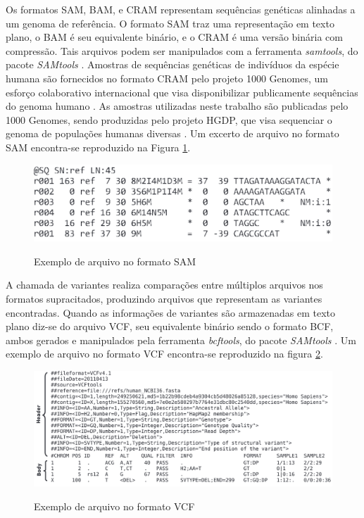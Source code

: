 \documentclass[cic,tc]{iiufrgs}
\begin{document}
Os formatos SAM, BAM, e CRAM representam sequências genéticas alinhadas a um
genoma de referência. O formato SAM traz uma representação em texto plano, o
BAM é seu equivalente binário, e o CRAM é uma versão binária com compressão.
Tais arquivos podem ser manipulados com a ferramenta \textit{samtools}, do pacote
\textit{SAMtools} \cite{danecek2021twelve}. Amostras de sequências genéticas de
indivíduos da espécie humana são fornecidos no formato CRAM pelo projeto 1000
Genomes, um esforço colaborativo internacional que visa disponibilizar
publicamente sequências do genoma humano \cite{via20101000}. As amostras
utilizadas neste trabalho são publicadas pelo 1000 Genomes, sendo produzidas
pelo projeto HGDP, que visa sequenciar o genoma de populações humanas diversas
\cite{cavalli2005human}. Um excerto de arquivo no formato SAM encontra-se
reproduzido na Figura \ref{fig:sam}.

\begin{figure}[h] \caption{Exemplo de arquivo no formato SAM} \begin{center}
\includegraphics[width=0.8\linewidth]{img/sam.png} \end{center}
 \label{fig:sam} \end{figure}

A chamada de variantes realiza comparações entre múltiplos arquivos nos
formatos supracitados, produzindo arquivos que representam as variantes
encontradas. Quando as informações de variantes são armazenadas em texto plano
diz-se do arquivo VCF, seu equivalente binário sendo o formato BCF, ambos
gerados e manipulados pela ferramenta \textit{bcftools}, do pacote
\textit{SAMtools} \cite{danecek2021twelve}. Um exemplo de arquivo no formato
VCF encontra-se reproduzido na figura \ref{fig:vcf}.

\begin{figure} \caption{Exemplo de arquivo no formato VCF} \begin{center}
\includegraphics[width=0.8\linewidth]{img/vcf.png} \end{center}
 \label{fig:vcf} \end{figure}
\end{document}
